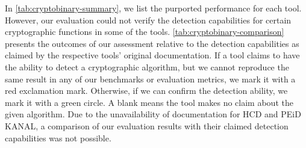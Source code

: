  In \autoref{tab:cryptobinary-summary}, we list the purported performance for each tool. However, our evaluation could not verify the detection capabilities for certain cryptographic functions in some of the tools. \autoref{tab:cryptobinary-comparison} presents the outcomes of our assessment relative to the detection capabilities as claimed by the respective tools' original documentation. If a tool claims to have the ability to detect a cryptographic algorithm, but we cannot reproduce the same result in any of our benchmarks or evaluation metrics, we mark it with a red exclamation mark. Otherwise, if we can confirm the detection ability, we mark it with a green circle. A blank means the tool makes no claim about the given algorithm.  Due to the unavailability of documentation for HCD and PEiD KANAL, a comparison of our evaluation results with their claimed detection capabilities was not possible.


